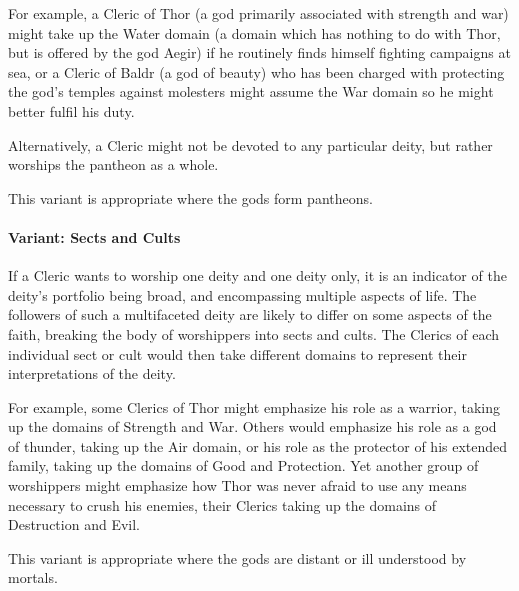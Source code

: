 For example, a Cleric of Thor (a god primarily associated with strength and war) might take up the Water domain (a domain which has nothing to do with Thor, but is offered by the god Aegir) if he routinely finds himself fighting campaigns at sea, or a Cleric of Baldr (a god of beauty) who has been charged with protecting the god's temples against molesters might assume the War domain so he might better fulfil his duty.

Alternatively, a Cleric might not be devoted to any particular deity, but rather worships the pantheon as a whole.

This variant is appropriate where the gods form pantheons.
\paragraph{Variant: Sects and Cults}
If a Cleric wants to worship one deity and one deity only, it is an indicator of the deity's portfolio being broad, and encompassing multiple aspects of life. 
The followers of such a multifaceted deity are likely to differ on some aspects of the faith, breaking the body of worshippers into sects and cults. 
The Clerics of each individual sect or cult would then take different domains to represent their interpretations of the deity.

For example, some Clerics of Thor might emphasize his role as a warrior, taking up the domains of Strength and War.
Others would emphasize his role as a god of thunder, taking up the Air domain, or his role as the protector of his extended family, taking up the domains of Good and Protection. 
Yet another group of worshippers might emphasize how Thor was never afraid to use any means necessary to crush his enemies,
their Clerics taking up the domains of Destruction and Evil.

This variant is appropriate where the gods are distant or ill understood by mortals.